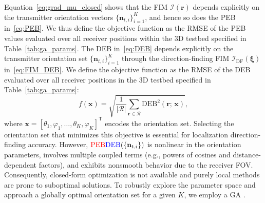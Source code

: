 \documentclass[journal]{IEEEtran}
\newcommand{\added}[1]{{\color{blue}#1}}
\newcommand{\deleted}[1]{{\color{red}#1}}
\begin{document}
\deleted{Equation~\eqref{eq:grad_mu_closed} shows that the FIM
$\mathcal{I}(\mathbf r)$ depends explicitly on the transmitter orientation
vectors $\{\mathbf n_{t,i}\}_{i=1}^{K}$, and hence so does the PEB
in~\eqref{eq:PEB}. We thus define the objective function as the RMSE of the PEB values evaluated over all receiver positions within the 3D testbed specified in Table~\ref{tab:ga_params}.}
\added{The DEB in~\eqref{eq:DEB} depends explicitly on the transmitter orientation set $\{\mathbf{n}_{t,i}\}_{i=1}^K$ through the direction-finding FIM $\mathcal{I}_{\mathrm{DF}}(\boldsymbol\xi)$ in~\eqref{eq:FIM_DEB}. We define the objective function as the RMSE of the DEB evaluated over all receiver positions in the 3D testbed specified in Table~\ref{tab:ga_params}:
\begin{equation}
f(\mathbf{x}) = \sqrt{\frac{1}{|\mathcal{R}|}\sum_{\mathbf{r}\in\mathcal{R}}\mathrm{DEB}^2(\mathbf{r};\,\mathbf{x})},
\label{eq:GA_objective}
\end{equation}
where $\mathbf{x}=[\theta_1,\varphi_1,\ldots,\theta_K,\varphi_K]^{\mathsf T}$ encodes the orientation set.}
Selecting the orientation set that minimizes this objective is essential for \deleted{localization} \added{direction-finding} accuracy. However, \(\deleted{\mathrm{PEB}}\added{\mathrm{DEB}}(\{\mathbf n_{t,i}\})\) is nonlinear in the orientation parameters, involves multiple coupled terms (e.g., powers of cosines and distance-dependent factors), and exhibits nonsmooth behavior due to the receiver FOV. Consequently, closed-form optimization is not available and purely local methods are prone to suboptimal solutions. To robustly explore the parameter space and approach a globally optimal orientation set for a given \(K\), we employ a GA \cite{Haupt2004}.
\end{document}
